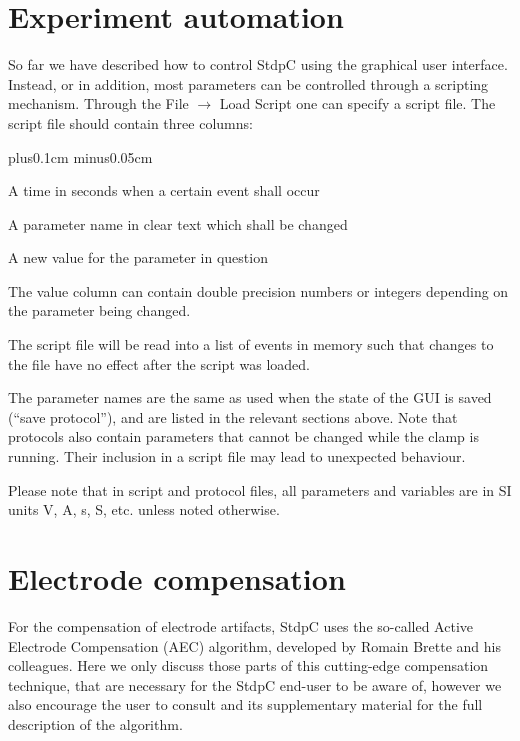 \documentclass{article}
\makeatletter
\newenvironment{myenum}{
\begin{list}{\labelenumi}{\setlength{\leftmargin}{1.3em}
  \setcounter{enumi}{0}
  \renewcommand{\item}{\addtocounter{enumi}{1}\unskip \vspace{-0.1cm}\@inmatherr\item
  \@ifnextchar [\@item{\@noitemargtrue \@item[\@itemlabel]} \unskip}}
  \itemsep0.1cm plus0.1cm minus0.05cm
  \listparindent0cm
  \setlength{\labelsep}{0.5em}
  \setlength{\labelwidth}{0.8em}}
{\end{list}}
\makeatother
\begin{document}
\section{Experiment automation} \label{scriptsect}

So far we have described how to control StdpC using the graphical
user interface. Instead, or in addition, most parameters can be
controlled through a scripting mechanism. Through the
File $\rightarrow$ Load Script one can specify a script file. The script
file should contain three columns:
\begin{myenum}
\item A time in seconds when a certain event shall occur
\item A parameter name in clear text which shall be changed
\item A new value for the parameter in question
\end{myenum}
The value column can contain double precision numbers or integers
depending on the parameter being changed.

The script file will be read into a list of events in memory such that
changes to the file have no effect after the script was loaded.

The parameter names are the same as used when the state of the GUI is
saved (``save protocol''), and are listed in the relevant sections above.
Note that protocols also contain parameters that cannot be changed
while the clamp is running. Their inclusion in a script file may lead
to unexpected behaviour.

Please note that in script and protocol files, all parameters and variables are in SI
units V, A, s, S, etc. unless noted otherwise.


\section{Electrode compensation} \label{eleccomp}

For the compensation of electrode artifacts, StdpC uses the so-called Active
Electrode Compensation (AEC) algorithm, developed by Romain Brette and his 
colleagues. Here we only discuss those parts of this cutting-edge
compensation technique, that are necessary for the StdpC end-user to be aware of,
however we also encourage the user to consult \cite{Brette2008} 
and its supplementary material for the full description of the algorithm.
\end{document}
